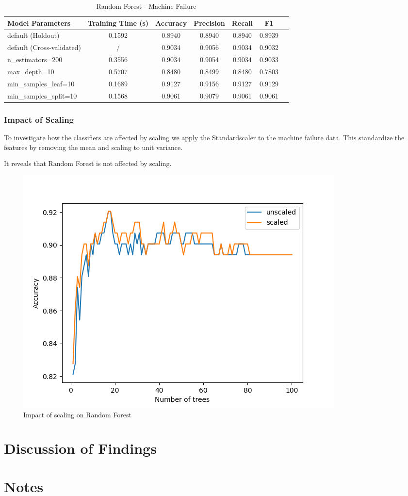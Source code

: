 \documentclass{article}
\begin{document}
\begin{table}[ht]
\centering
\begin{tabular}{l|c|c|c|c|c|c}
\textbf{Model Parameters} & \textbf{Training Time (s)} & \textbf{Accuracy} & \textbf{Precision} & \textbf{Recall} & \textbf{F1} \\\hline
default (Holdout) & 0.1592  & 0.8940 & 0.8940 & 0.8940 & 0.8939 \\
default (Cross-validated) & /  & 0.9034 & 0.9056 & 0.9034 & 0.9032 \\
n\_estimators=200 & 0.3556  & 0.9034 & 0.9054 & 0.9034  & 0.9033 \\
max\_depth=10 & 0.5707  & 0.8480 & 0.8499 & 0.8480 & 0.7803 \\
min\_samples\_leaf=10 & 0.1689  & 0.9127  & 0.9156 & 0.9127  & 0.9129 \\
min\_samples\_split=10 & 0.1568  & 0.9061 & 0.9079 & 0.9061 & 0.9061 \\
\end{tabular}
\caption{Random Forest - Machine Failure}
\label{tab:Random Forest - Machine Failure}
\end{table}

\subsubsection{Impact of Scaling}

To investigate how the classifiers are affected by scaling we apply the Standardscaler to the machine failure data. This standardize the features by removing the mean and scaling to unit variance.

It reveals that Random Forest is not affected by scaling.

\begin{figure}[H]
\centering
\includegraphics[width=0.5\linewidth]{Machine_scaling.png}
\caption{\label{fig:hist:price}Impact of scaling on Random Forest}
\end{figure}



\section{Discussion of Findings}




\section{Notes}
\end{document}
